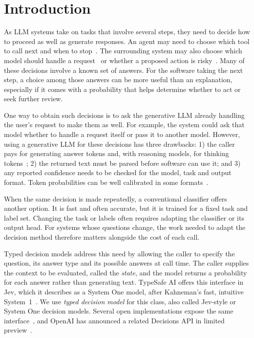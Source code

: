 \section{Introduction}
\label{sec:intro}


As LLM systems take on tasks that involve several steps, they need to decide how to proceed as well as generate responses. An agent may need to choose which tool to call next and when to stop~\cite{yang2026toward}. The surrounding system may also choose which model should handle a request~\cite{varangotreille2025doing} or whether a proposed action is risky~\cite{liu2026evaluating}. Many of these decisions involve a known set of answers. For the software taking the next step, a choice among those answers can be more useful than an explanation, especially if it comes with a probability that helps determine whether to act or seek further review.

One way to obtain such decisions is to ask the generative LLM already handling the user's request to make them as well. For example, the system could ask that model whether to handle a request itself or pass it to another model. However, using a generative LLM for these decisions has three drawbacks: 1) the caller pays for generating answer tokens and, with reasoning models, for thinking tokens~\cite{sui2025stop}; 2) the returned text must be parsed before software can use it; and 3) any reported confidence needs to be checked for the model, task and output format. Token probabilities can be well calibrated in some formats~\cite{kadavath2022language}.

When the same decision is made repeatedly, a conventional classifier offers another option. It is fast and often accurate, but it is trained for a fixed task and label set. Changing the task or labels often requires adapting the classifier or its output head. For systems whose questions change, the work needed to adapt the decision method therefore matters alongside the cost of each call.

Typed decision models address this need by allowing the caller to specify the question, its answer type and its possible answers at call time. The caller supplies the context to be evaluated, called the \emph{state}, and the model returns a probability for each answer rather than generating text. TypeSafe AI offers this interface in Jev, which it describes as a System One model, after Kahneman's fast, intuitive System~1~\cite{kahneman2011thinking,typesafe2026docs}. We use \emph{typed decision model} for this class, also called Jev-style or System One decision models. Several open implementations expose the same interface~\cite{convai2026laya,palmer2026kev,bespoke2026nimble,mapika2026decider,lee2026semif,nokia2026anyjev}, and OpenAI has announced a related Decisions API in limited preview~\cite{openai2026decisions}.

